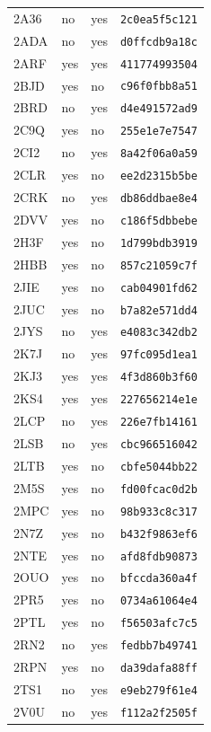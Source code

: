 \documentclass[11pt]{article}
\begin{document}
\begin{longtable}{llll}
2A36 & no & yes & \texttt{2c0ea5f5c121}\\
2ADA & no & yes & \texttt{d0ffcdb9a18c}\\
2ARF & yes & yes & \texttt{411774993504}\\
2BJD & yes & no & \texttt{c96f0fbb8a51}\\
2BRD & no & yes & \texttt{d4e491572ad9}\\
2C9Q & yes & no & \texttt{255e1e7e7547}\\
2CI2 & no & yes & \texttt{8a42f06a0a59}\\
2CLR & yes & no & \texttt{ee2d2315b5be}\\
2CRK & no & yes & \texttt{db86ddbae8e4}\\
2DVV & yes & no & \texttt{c186f5dbbebe}\\
2H3F & yes & no & \texttt{1d799bdb3919}\\
2HBB & yes & no & \texttt{857c21059c7f}\\
2JIE & yes & no & \texttt{cab04901fd62}\\
2JUC & yes & no & \texttt{b7a82e571dd4}\\
2JYS & no & yes & \texttt{e4083c342db2}\\
2K7J & no & yes & \texttt{97fc095d1ea1}\\
2KJ3 & yes & yes & \texttt{4f3d860b3f60}\\
2KS4 & yes & yes & \texttt{227656214e1e}\\
2LCP & no & yes & \texttt{226e7fb14161}\\
2LSB & no & yes & \texttt{cbc966516042}\\
2LTB & yes & no & \texttt{cbfe5044bb22}\\
2M5S & yes & no & \texttt{fd00fcac0d2b}\\
2MPC & yes & no & \texttt{98b933c8c317}\\
2N7Z & yes & no & \texttt{b432f9863ef6}\\
2NTE & yes & no & \texttt{afd8fdb90873}\\
2OUO & yes & no & \texttt{bfccda360a4f}\\
2PR5 & yes & no & \texttt{0734a61064e4}\\
2PTL & yes & no & \texttt{f56503afc7c5}\\
2RN2 & no & yes & \texttt{fedbb7b49741}\\
2RPN & yes & no & \texttt{da39dafa88ff}\\
2TS1 & no & yes & \texttt{e9eb279f61e4}\\
2V0U & no & yes & \texttt{f112a2f2505f}\\

\end{longtable}
\end{document}
